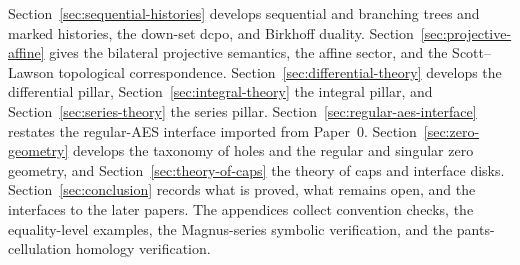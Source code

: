 Section~\ref{sec:sequential-histories} develops sequential and branching trees
and marked histories, the down-set dcpo, and Birkhoff duality.
Section~\ref{sec:projective-affine} gives the bilateral projective semantics,
the affine sector, and the Scott--Lawson topological correspondence.
Section~\ref{sec:differential-theory} develops the differential pillar,
Section~\ref{sec:integral-theory} the integral pillar, and
Section~\ref{sec:series-theory} the series pillar.
Section~\ref{sec:regular-aes-interface} restates the regular-AES interface
imported from Paper~0.  Section~\ref{sec:zero-geometry} develops the taxonomy of
holes and the regular and singular zero geometry, and
Section~\ref{sec:theory-of-caps} the theory of caps and interface disks.
Section~\ref{sec:conclusion} records what is proved, what remains open, and the
interfaces to the later papers.  The appendices collect convention checks, the
equality-level examples, the Magnus-series symbolic verification, and the
pants-cellulation homology verification.
